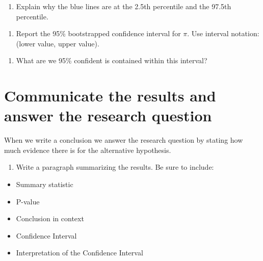 \documentclass[
]{report}
\providecommand{\tightlist}{%
  \setlength{\itemsep}{0pt}\setlength{\parskip}{0pt}}
\begin{document}
\begin{enumerate}
\def\labelenumi{\arabic{enumi}.}
\setcounter{enumi}{24}
\tightlist
\item
  Explain why the blue lines are at the 2.5th percentile and the 97.5th percentile.
\end{enumerate}

\vspace{1in}

\begin{enumerate}
\def\labelenumi{\arabic{enumi}.}
\setcounter{enumi}{25}
\tightlist
\item
  Report the 95\% bootstrapped confidence interval for \(\pi\). Use interval notation: (lower value, upper value).
\end{enumerate}

\vspace{1in}

\begin{enumerate}
\def\labelenumi{\arabic{enumi}.}
\setcounter{enumi}{26}
\tightlist
\item
  What are we 95\% confident is contained within this interval?
\end{enumerate}

\vspace{1in}

\hypertarget{communicate-the-results-and-answer-the-research-question}{%
\section{Communicate the results and answer the research question}\label{communicate-the-results-and-answer-the-research-question}}

When we write a conclusion we answer the research question by stating how much evidence there is for the alternative hypothesis.

\begin{enumerate}
\def\labelenumi{\arabic{enumi}.}
\setcounter{enumi}{27}
\tightlist
\item
  Write a paragraph summarizing the results. Be sure to include:
\end{enumerate}

\begin{itemize}
\item
  Summary statistic
\item
  P-value
\item
  Conclusion in context
\item
  Confidence Interval
\item
  Interpretation of the Confidence Interval
\end{itemize}
\end{document}
